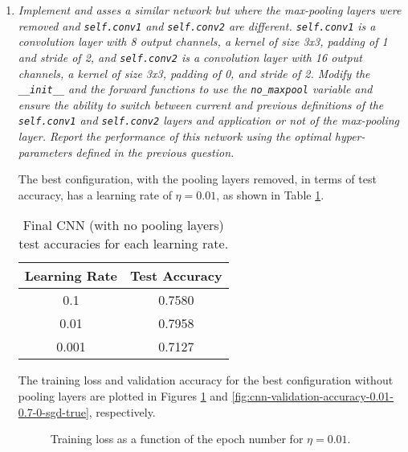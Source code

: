 \documentclass[12pt]{article}
\begin{document}
\begin{enumerate}[leftmargin=\labelsep]
    \item \textit{Implement and asses a similar network but where the max-pooling layers were removed and \texttt{self.conv1} and \texttt{self.conv2} are different. \texttt{self.conv1} is a convolution layer with 8 output channels, a kernel of size 3x3, padding of 1 and stride of 2, and \texttt{self.conv2} is a convolution layer with 16 output channels, a kernel of size 3x3, padding of 0, and stride of 2. Modify the \texttt{\_\_init\_\_} and the forward functions to use the \texttt{no\_maxpool} variable and ensure the ability to switch between current and previous definitions of the \texttt{self.conv1} and \texttt{self.conv2} layers and application or not of the max-pooling layer. Report the performance of this network using the optimal hyper-parameters defined in the previous question.}

          \vspace{12pt}

          The best configuration, with the pooling layers removed, in terms of test accuracy, has a learning rate of $\eta = 0.01$, as shown in Table \ref{tab:cnn-test-acc}.

          \begin{table}[H]
              \centering
              \begin{tabular}{|c|c|}
                  \hline
                  \textbf{Learning Rate} & \textbf{Test Accuracy} \\ \hline
                  0.1                    & 0.7580                 \\ \hline
                  0.01                   & 0.7958                 \\ \hline
                  0.001                  & 0.7127                 \\ \hline
              \end{tabular}
              \caption{Final CNN (with no pooling layers) test accuracies for each learning rate.}
              \label{tab:cnn-test-acc}
          \end{table}

          The training loss and validation accuracy for the best configuration without pooling layers are plotted in Figures \ref{fig:cnn-training-loss-0.01-0.7-0-sgd-true} and \ref{fig:cnn-validation-accuracy-0.01-0.7-0-sgd-true}, respectively.

          \begin{figure}[H]
              \centering
              
              \caption{Training loss as a function of the epoch number for $\eta = 0.01$.}
              \label{fig:cnn-training-loss-0.01-0.7-0-sgd-true}
          \end{figure}


\end{enumerate}
\end{document}
